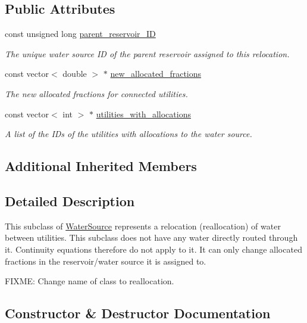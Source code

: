 \subsection*{Public Attributes}
\begin{DoxyCompactItemize}
\item 
const unsigned long \mbox{\hyperlink{classRelocation_a61282254064f00641aaec667a7eb0652}{parent\+\_\+reservoir\+\_\+\+ID}}
\begin{DoxyCompactList}\small\item\em The unique water source ID of the parent reservoir assigned to this relocation. \end{DoxyCompactList}\item 
const vector$<$ double $>$ $\ast$ \mbox{\hyperlink{classRelocation_acc95d1be560fed2b4a1b4b2ae605ae67}{new\+\_\+allocated\+\_\+fractions}}
\begin{DoxyCompactList}\small\item\em The new allocated fractions for connected utilities. \end{DoxyCompactList}\item 
const vector$<$ int $>$ $\ast$ \mbox{\hyperlink{classRelocation_ae426f390487b6b67f19bfbf556c922c2}{utilities\+\_\+with\+\_\+allocations}}
\begin{DoxyCompactList}\small\item\em A list of the I\+Ds of the utilities with allocations to the water source. \end{DoxyCompactList}\end{DoxyCompactItemize}
\subsection*{Additional Inherited Members}


\subsection{Detailed Description}
This subclass of \mbox{\hyperlink{classWaterSource}{Water\+Source}} represents a relocation (reallocation) of water between utilities. This subclass does not have any water directly routed through it. Continuity equations therefore do not apply to it. It can only change allocated fractions in the reservoir/water source it is assigned to. 

F\+I\+X\+ME\+: Change name of class to reallocation. 

\subsection{Constructor \& Destructor Documentation}
\mbox{\label{classRelocation_abeada1f0c797d8992c1e6a200b571574}} 
